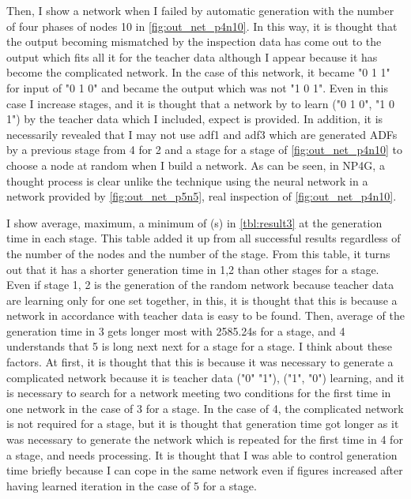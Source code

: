 \documentclass{article}
\begin{document}
Then, I show a network when I failed by automatic generation with the number of four phases of nodes 10 in \ref{fig:out_net_p4n10}.
In this way, it is thought that the output becoming mismatched by the inspection data has come out to the output which fits all it for the teacher data although I appear because it has become the complicated network.
In the case of this network, it became "0 1 1" for input of "0 1 0" and became the output which was not "1 0 1".
Even in this case I increase stages, and it is thought that a network by to learn ("0 1 0", "1 0 1") by the teacher data which I included, expect is provided.
In addition, it is necessarily revealed that I may not use adf1 and adf3 which are generated ADFs by a previous stage from 4 for 2 and a stage for a stage of \ref{fig:out_net_p4n10} to choose a node at random when I build a network.
As can be seen, in NP4G, a thought process is clear unlike the technique using the neural network in a network provided by \ref{fig:out_net_p5n5}, real inspection of \ref{fig:out_net_p4n10}.

I show average, maximum, a minimum of (s) in \ref{tbl:result3} at the generation time in each stage.
This table added it up from all successful results regardless of the number of the nodes and the number of the stage.
From this table, it turns out that it has a shorter generation time in 1,2 than other stages for a stage.
Even if stage 1, 2 is the generation of the random network because teacher data are learning only for one set together, in this, it is thought that this is because a network in accordance with teacher data is easy to be found.
Then, average of the generation time in 3 gets longer most with 2585.24s for a stage, and 4 understands that 5 is long next next for a stage for a stage.
I think about these factors.
At first, it is thought that this is because it was necessary to generate a complicated network because it is teacher data ("0" "1"), ("1", "0") learning, and it is necessary to search for a network meeting two conditions for the first time in one network in the case of 3 for a stage.
In the case of 4, the complicated network is not required for a stage, but it is thought that generation time got longer as it was necessary to generate the network which is repeated for the first time in 4 for a stage, and needs processing.
It is thought that I was able to control generation time briefly because I can cope in the same network even if figures increased after having learned iteration in the case of 5 for a stage.
\end{document}
